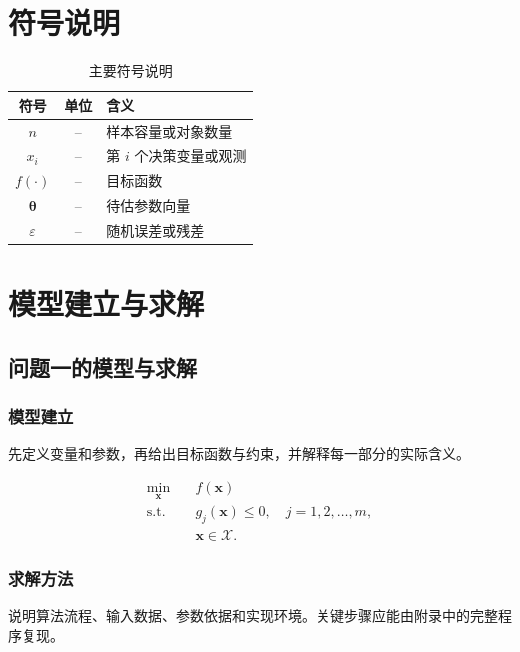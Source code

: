 \documentclass[withoutpreface,bwprint]{cumcmthesis}
\begin{document}
\section{符号说明}

\begin{table}[htbp]
  \centering
  \caption{主要符号说明}
  \label{tab:symbol}
  \begin{tabular}{ccl}
    \toprule
    符号 & 单位 & 含义 \\
    \midrule
    $n$ & -- & 样本容量或对象数量 \\
    $x_i$ & -- & 第 $i$ 个决策变量或观测 \\
    $f(\cdot)$ & -- & 目标函数 \\
    $\bm{\theta}$ & -- & 待估参数向量 \\
    $\varepsilon$ & -- & 随机误差或残差 \\
    \bottomrule
  \end{tabular}
\end{table}

\section{模型建立与求解}

\subsection{问题一的模型与求解}

\subsubsection{模型建立}

先定义变量和参数，再给出目标函数与约束，并解释每一部分的实际含义。

\begin{equation}
\begin{aligned}
\min_{\bm{x}}\quad
& f(\bm{x}) \\
\text{s.t.}\quad
& g_j(\bm{x}) \leq 0,\quad j=1,2,\ldots,m,\\
& \bm{x}\in\mathcal{X}.
\end{aligned}
\end{equation}

\subsubsection{求解方法}

说明算法流程、输入数据、参数依据和实现环境。关键步骤应能由附录中的完整程序复现。
\end{document}
